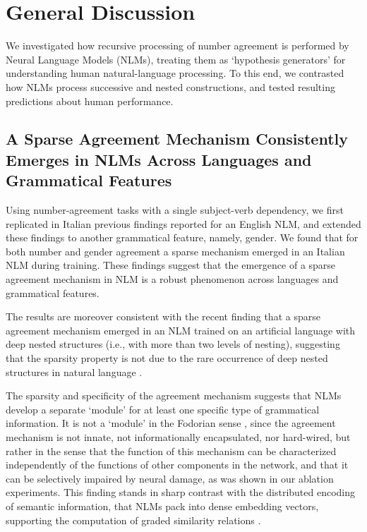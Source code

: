 \section{General Discussion}
We investigated how recursive processing of number agreement is performed by Neural Language Models (NLMs), treating them as `hypothesis generators' for understanding human natural-language processing. To this end, we contrasted how NLMs process successive and nested constructions, and tested resulting predictions about human performance. 

\subsection{A Sparse Agreement Mechanism Consistently Emerges in NLMs Across Languages and Grammatical Features}
Using number-agreement tasks with a single subject-verb dependency, we first replicated in Italian previous findings reported for an English NLM, and extended these findings to another grammatical feature, namely, gender. We found that for both number and gender agreement a sparse mechanism emerged in an Italian NLM during training. These findings suggest that the emergence of a sparse agreement mechanism in NLM is a robust phenomenon across languages and grammatical features. 

The results are moreover consistent with the recent finding that a sparse agreement mechanism emerged in an NLM trained on an artificial language with deep nested structures (i.e., with more than two levels of nesting), suggesting that the sparsity property is not due to the rare occurrence of deep nested structures in natural language \citep{lakretz2020recursion}. 

The sparsity and specificity of the agreement mechanism suggests that NLMs develop a separate `module' for at least one specific type of grammatical information. It is not a `module' in the Fodorian sense \citep{fodor1983modularity}, since the agreement mechanism is not innate, not informationally encapsulated, nor hard-wired, but rather in the sense that the function of this mechanism can be characterized independently of the functions of other components in the network, and that it can be selectively impaired by neural damage, as was shown in our ablation experiments. This finding stands in sharp contrast with the distributed encoding of semantic information, that NLMs pack into dense embedding vectors, supporting the computation of graded similarity relations \citep{Mikolov:etal:2013a,Jurafsky:Martin:2020}. 

